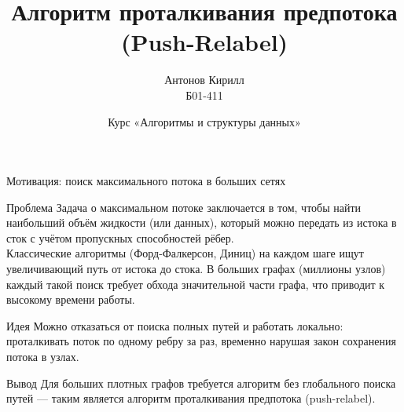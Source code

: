 \documentclass[14pt, aspectratio=169]{beamer}
\title{Алгоритм проталкивания предпотока (Push-Relabel)}
\author{Антонов Кирилл \\ Б01-411}
\date{Курс «Алгоритмы и структуры данных»}
\begin{document}
\begin{frame}
\titlepage
\end{frame}

\begin{frame}{Мотивация: поиск максимального потока в больших сетях}
\scriptsize
\begin{block}{Проблема}
Задача о максимальном потоке заключается в том, чтобы найти наибольший объём жидкости (или данных), который можно передать из истока в сток с учётом пропускных способностей рёбер. \\
Классические алгоритмы (Форд-Фалкерсон, Диниц) на каждом шаге ищут увеличивающий путь от истока до стока. В больших графах (миллионы узлов) каждый такой поиск требует обхода значительной части графа, что приводит к высокому времени работы.
\end{block}

\begin{block}{Идея}
Можно отказаться от поиска полных путей и работать локально: проталкивать поток по одному ребру за раз, временно нарушая закон сохранения потока в узлах.
\end{block}

\begin{alertblock}{Вывод}
Для больших плотных графов требуется алгоритм без глобального поиска путей — таким является алгоритм проталкивания предпотока (push-relabel).
\end{alertblock}

\end{frame}
\end{document}
